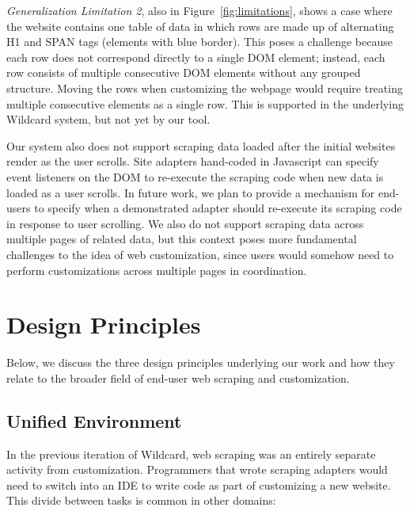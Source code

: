 \documentclass[sigconf,10pt]{acmart}
\begin{document}
\emph{Generalization Limitation 2}, also in
Figure~\ref{fig:limitations}, shows a case where the website contains
one table of data in which rows are made up of alternating H1 and SPAN
tags (elements with blue border). This poses a challenge because each
row does not correspond directly to a single DOM element; instead, each
row consists of multiple consecutive DOM elements without any grouped
structure. Moving the rows when customizing the webpage would require
treating multiple consecutive elements as a single row. This is
supported in the underlying Wildcard system, but not yet by our tool.

Our system also does not support scraping data loaded after the initial
websites render as the user scrolls. Site adapters hand-coded in
Javascript can specify event listeners on the DOM to re-execute the
scraping code when new data is loaded as a user scrolls. In future work,
we plan to provide a mechanism for end-users to specify when a
demonstrated adapter should re-execute its scraping code in response to
user scrolling. We also do not support scraping data across multiple
pages of related data, but this context poses more fundamental
challenges to the idea of web customization, since users would somehow
need to perform customizations across multiple pages in coordination.

\hypertarget{sec:design-principles}{%
\section{Design Principles}\label{sec:design-principles}}

Below, we discuss the three design principles underlying our work and
how they relate to the broader field of end-user web scraping and
customization.

\hypertarget{unified-environment}{%
\subsection{Unified Environment}\label{unified-environment}}

In the previous iteration of Wildcard, web scraping was an entirely
separate activity from customization. Programmers that wrote scraping
adapters would need to switch into an IDE to write code as part of
customizing a new website. This divide between tasks is common in other
domains:
\end{document}
